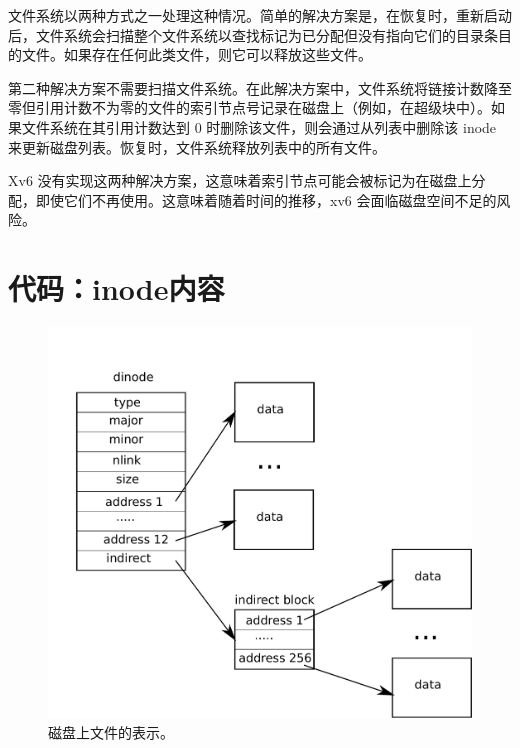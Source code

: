 \documentclass[UTF8]{article}
\begin{document}
文件系统以两种方式之一处理这种情况。简单的解决方案是，在恢复时，重新启动后，文件系统会扫描整个文件系统以查找标记为已分配但没有指向它们的目录条目的文件。如果存在任何此类文件，则它可以释放这些文件。  

第二种解决方案不需要扫描文件系统。在此解决方案中，文件系统将链接计数降至零但引用计数不为零的文件的索引节点号记录在磁盘上（例如，在超级块中）。如果文件系统在其引用计数达到 0 时删除该文件，则会通过从列表中删除该 inode 来更新磁盘列表。恢复时，文件系统释放列表中的所有文件。  

Xv6 没有实现这两种解决方案，这意味着索引节点可能会被标记为在磁盘上分配，即使它们不再使用。这意味着随着时间的推移，xv6 会面临磁盘空间不足的风险。
    \section{代码：inode内容  }     

   \begin{figure}[t]
\center
\includegraphics[scale=0.5]{fig/inode.pdf}
\caption{磁盘上文件的表示。  }
\label{fig:inode}
\end{figure}     
\end{document}
